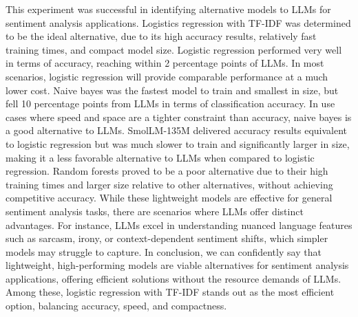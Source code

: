 \documentclass[10pt,twocolumn,letterpaper]{article}
\begin{document}
This experiment was successful in identifying alternative models to LLMs for sentiment analysis applications. Logistics regression with TF-IDF was determined to be the ideal alternative, due to its high accuracy results, relatively fast training times, and compact model size. Logistic regression performed very well in terms of accuracy, reaching within 2 percentage points of LLMs. In most scenarios, logistic regression will provide comparable performance at a much lower cost. Naive bayes was the fastest model to train and smallest in size, but fell 10 percentage points from LLMs in terms of classification accuracy. In use cases where speed and space are a tighter constraint than accuracy, naive bayes is a good alternative to LLMs. SmolLM-135M delivered accuracy results equivalent to logistic regression but was much slower to train and significantly larger in size, making it a less favorable alternative to LLMs when compared to logistic regression. Random forests proved to be a poor alternative due to their high training times and larger size relative to other alternatives, without achieving competitive accuracy. While these lightweight models are effective for general sentiment analysis tasks, there are scenarios where LLMs offer distinct advantages. For instance, LLMs excel in understanding nuanced language features such as sarcasm, irony, or context-dependent sentiment shifts, which simpler models may struggle to capture. In conclusion, we can confidently say that lightweight, high-performing models are viable alternatives for sentiment analysis applications, offering efficient solutions without the resource demands of LLMs. Among these, logistic regression with TF-IDF stands out as the most efficient option, balancing accuracy, speed, and compactness.



\begin{table}
\begin{center}
\end{center}
\caption{ML techniques Performance on IMDb Dataset}
\label{tab:large-models-metrics}
\end{table}
\end{document}
